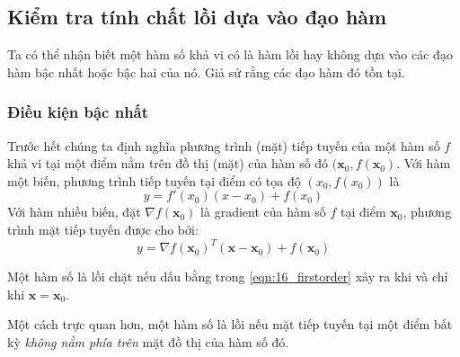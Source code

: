  
 
\subsection{Kiểm tra tính chất lồi dựa vào đạo hàm}
Ta có thể nhận biết một hàm số khả vi có là hàm lồi hay không dựa vào các
đạo hàm bậc nhất hoặc bậc hai của nó. Giả sử rằng các
đạo hàm đó tồn tại. 

\subsubsection{Điều kiện bậc nhất}

Trước hết chúng ta định nghĩa phương trình (mặt) tiếp tuyến của một hàm số
$f$ khả vi tại một điểm nằm trên đồ thị (mặt) của hàm số đó $(\mathbf{x}_0,
f(\mathbf{x}_0)$. Với hàm một biến, phương trình tiếp tuyến tại điểm có tọa độ
$(x_0, f(x_0))$ là 
\begin{equation*} 
y = f'(x_0)(x - x_0) + f(x_0) 
\end{equation*} 
Với hàm nhiều biến, đặt $\nabla f(\mathbf{x}_0)$ là gradient của hàm số $f$ tại điểm $\mathbf{x}_0$, phương trình mặt tiếp tuyến được cho bởi: 
\begin{equation*} 
y = \nabla f(\mathbf{x}_0)^T (\mathbf{x} - \mathbf{x}_0) + f(\mathbf{x}_0) 
\end{equation*} 

    

 
Một hàm số là lồi chặt nếu dấu bằng trong \eqref{eqn:16_firstorder} xảy ra khi và chỉ khi $\mathbf{x} = \mathbf{x}_0$. 
 
Một cách trực quan hơn, một hàm số là lồi nếu mặt tiếp tuyến tại một điểm
bất kỳ \textit{không nằm phía trên} mặt đồ thị của hàm số đó.




